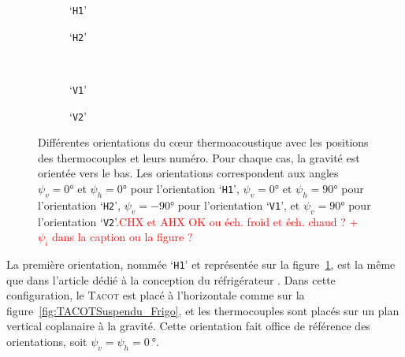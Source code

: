 \begin{figure}[!ht]
    \centering
	\begin{subfigure}{.47\textwidth}
		\centering
		
		\caption{`\texttt{H1}'}
		\label{fig:OrientationCore_H1}
	\end{subfigure}		%
	\begin{subfigure}{.47\textwidth}
		\centering
		
		\caption{`\texttt{H2}'}
		\label{fig:OrientationCore_H2}
	\end{subfigure} \\ \vspace{1cm}
	\begin{subfigure}{.47\textwidth}
		\centering
		
		\caption{`\texttt{V1}'}
		\label{fig:OrientationCore_V1}
	\end{subfigure} %
	\begin{subfigure}{.47\textwidth}
		\centering
		
		\caption{`\texttt{V2}'}
		\label{fig:OrientationCore_V2}
	\end{subfigure}   
    \caption{Différentes orientations du c\oe{}ur thermoacoustique avec les positions des thermocouples et leurs numéro. Pour chaque cas, la gravité est orientée vers le bas. Les orientations correspondent aux angles  $\psi_v=\ang{0}$ et $\psi_h=\ang{0}$ pour l'orientation `\texttt{H1}',  $\psi_v=\ang{0}$ et $\psi_h=\ang{+90}$ pour l'orientation `\texttt{H2}',  $\psi_v=\ang{-90}$ pour l'orientation `\texttt{V1}', et  $\psi_v=\ang{+90}$ pour l'orientation `\texttt{V2}'.\textcolor{red}{CHX et AHX OK ou éch. froid et éch. chaud ? + $\psi_i$ dans la caption ou la figure ?}}
    \label{fig:OrientationCore} %
\end{figure}

\medskip

La première orientation, nommée `\texttt{H1}' et représentée sur la figure~\ref{fig:OrientationCore_H1}, est la même que dans l'article dédié à la conception du réfrigérateur \cite{ramadan_design_2021}. Dans cette configuration, le \textsc{Tacot} est placé à l'horizontale comme sur la figure~\ref{fig:TACOTSuspendu_Frigo}, et les thermocouples sont placés sur un plan vertical coplanaire à la gravité. Cette orientation fait office de référence des orientations, soit $\psi_v=\psi_h=\qty{0}{\degree}$.

